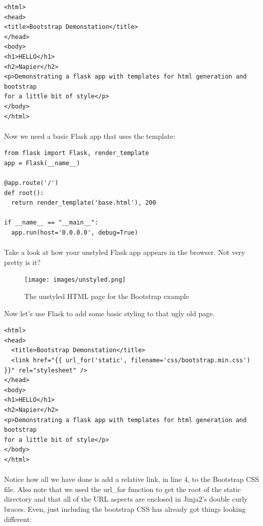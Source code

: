 \documentclass[12pt, a4paper, oneside]{book}
\begin{document}
{\begin{lstlisting}
<html>
<head>
<title>Bootstrap Demonstation</title>
</head>
<body>
<h1>HELLO</h1>
<h2>Napier</h2>
<p>Demonstrating a flask app with templates for html generation and bootstrap
for a little bit of style</p>
</body>
</html>
\end{lstlisting}

\paragraph{} Now we need a basic Flask app that uses the template:

\begin{lstlisting}
from flask import Flask, render_template
app = Flask(__name__)

@app.route('/')
def root():
  return render_template('base.html'), 200

if __name__ == "__main__":
  app.run(host='0.0.0.0', debug=True)
\end{lstlisting}

\paragraph{} Take a look at how your unstyled Flask app appears in the browser. Not very pretty is it?  

\begin{figure}[H]
\centering
\texttt{[image: images/unstyled.png]}
\caption{The unstyled HTML page for the Bootstrap example}
\label{fig:unstyled}
\end{figure}

Now let's use Flask to add some basic styling to that ugly old page.

\begin{lstlisting}
<html>
<head>
  <title>Bootstrap Demonstation</title>
  <link href="{{ url_for('static', filename='css/bootstrap.min.css') }}" rel="stylesheet" />
</head>
<body>
<h1>HELLO</h1>
<h2>Napier</h2>
<p>Demonstrating a flask app with templates for html generation and bootstrap
for a little bit of style</p>
</body>
</html>
\end{lstlisting}

\paragraph{} Notice how all we have done is add a relative link, in line 4, to the Bootstrap CSS file. Also note that we used the url\_for function to get the root of the static directory and that all of the URL aspects are enclosed in Jinja2's double curly braces.  Even, just including the bootstrap CSS has already got things looking different:

}
\end{document}

